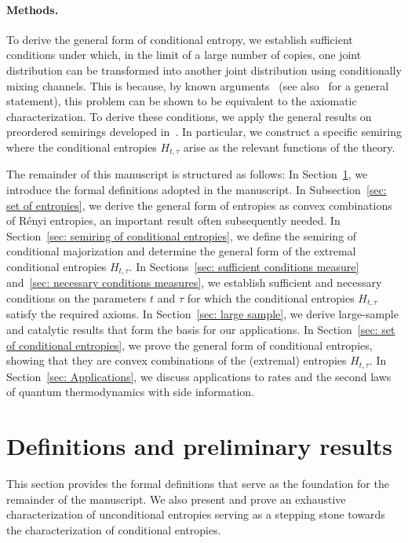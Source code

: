 \documentclass[aps,pra,11pt,onecolumn,nofootinbib,tightenlines]{revtex4-2}
\theoremstyle{definition}
\begin{document}
\paragraph*{Methods.}
To derive the general form of conditional entropy, we establish sufficient conditions under which, in the limit of a large number of copies, one joint distribution can be transformed into another joint distribution using conditionally mixing channels. This is because, by known arguments~\cite{mu21_renyi} (see also~\cite{haapasalo_inprep} for a general statement), this problem can be shown to be equivalent to the axiomatic characterization.
To derive these conditions, we apply the general results on preordered semirings developed in~\cite{fritz2023abstract,fritz2023abstractII}.
In particular, we construct a specific semiring where the conditional entropies \( H_{t,\tau} \) arise as the relevant functions of the theory.

\bigskip

The remainder of this manuscript is structured as follows: In Section~\ref{sec: formal definitions}, we introduce the formal definitions adopted in the manuscript. In Subsection~\ref{sec: set of entropies}, we derive the general form of entropies as convex combinations of R\'enyi entropies, an important result often subsequently needed. In Section~\ref{sec: semiring of conditional entropies}, we define the semiring of conditional majorization and determine the general form of the extremal conditional entropies $H_{t,\tau}$. In Sections~\ref{sec: sufficient conditions measure} and~\ref{sec: necessary conditions measures}, we establish sufficient and necessary conditions on the parameters $t$ and $\tau$ for which the conditional entropies $H_{t,\tau}$ satisfy the required axioms. In Section~\ref{sec: large sample}, we derive large-sample and catalytic results that form the basis for our applications. In Section~\ref{sec: set of conditional entropies}, we prove the general form of conditional entropies, showing that they are convex combinations of the (extremal) entropies $H_{t,\tau}$. In Section~\ref{sec: Applications}, we discuss applications to rates and the second laws of quantum thermodynamics with side information.

\section{Definitions and preliminary results}
\label{sec: formal definitions}
This section provides the formal definitions that serve as the foundation for the remainder of the manuscript. We also present and prove an exhaustive characterization of unconditional entropies serving as a stepping stone towards the characterization of conditional entropies.
\end{document}
